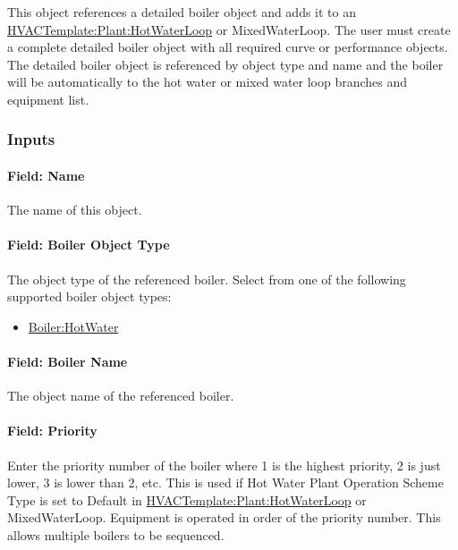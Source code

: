 This object references a detailed boiler object and adds it to an \hyperref[hvactemplateplanthotwaterloop]{HVACTemplate:Plant:HotWaterLoop} or MixedWaterLoop. The user must create a complete detailed boiler object with all required curve or performance objects. The detailed boiler object is referenced by object type and name and the boiler will be automatically to the hot water or mixed water loop branches and equipment list.

\subsubsection{Inputs}\label{inputs-30-000}

\paragraph{Field: Name}\label{field-name-17-002}

The name of this object.

\paragraph{Field: Boiler Object Type}

The object type of the referenced boiler. Select from one of the following supported boiler object types:

\begin{itemize}
\tightlist
\item
  \hyperref[boilerhotwater]{Boiler:HotWater}
\end{itemize}

\paragraph{Field: Boiler Name}\label{field-boiler-name}

The object name of the referenced boiler.

\paragraph{Field: Priority}\label{field-priority-5}

Enter the priority number of the boiler where 1 is the highest priority, 2 is just lower, 3 is lower than 2, etc. This is used if Hot Water Plant Operation Scheme Type is set to Default in \hyperref[hvactemplateplanthotwaterloop]{HVACTemplate:Plant:HotWaterLoop} or MixedWaterLoop. Equipment is operated in order of the priority number. This allows multiple boilers to be sequenced.

